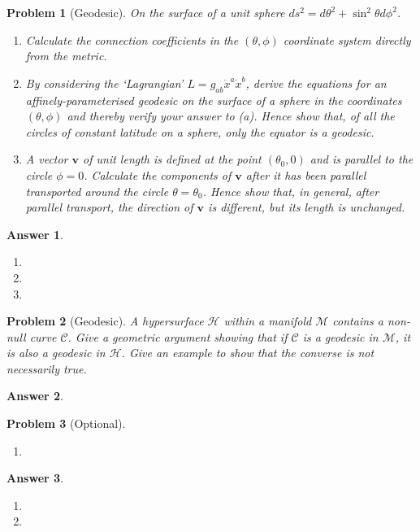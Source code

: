 \documentclass[a4paper]{article}
\newtheorem{ans}{Answer}[subsection]
\theoremstyle{new}
\newtheorem{qns}{Problem}[section]
\begin{document}
\begin{qns}[Geodesic]
On the surface of a unit sphere $ds^2 = d\theta^2 + \sin^2\theta d\phi^2$.
\begin{enumerate}[label=(\alph*)]
\item  Calculate the connection coefficients in the $(\theta,\phi)$ coordinate system directly from the metric.
\item By considering the ‘Lagrangian’ $L=g_{ab}\dot{x}^a\dot{x}^b$, derive the equations for an affinely-parameterised geodesic on the surface of a sphere in the coordinates $(\theta, \phi)$ and thereby verify your answer to (a). Hence show that, of all the circles of constant latitude on a sphere, only the equator is a geodesic.
\item A vector $\mathbf{v}$ of unit length is defined at the point $(\theta_0,0)$ and is parallel to the circle $\phi = 0$. Calculate the components of $\mathbf{v}$ after it has been parallel transported around the circle $\theta=\theta_0$. Hence show that, in general, after parallel transport, the direction of $\mathbf{v}$ is different, but its length is unchanged.
\end{enumerate}
\end{qns}
\begin{ans}\leavevmode
\begin{enumerate}[label=(\alph*)]
\item

\item 

\item 
\end{enumerate}
\end{ans}
\begin{qns}[Geodesic]
A hypersurface $\mathcal{H}$ within a manifold $\mathcal{M}$ contains a non-null curve $\mathcal{C}$. Give a geometric argument showing that if $\mathcal{C}$ is a geodesic in $\mathcal{M}$, it is also a geodesic in $\mathcal{H}$. Give an example to show that the converse is not necessarily true.
\end{qns}
\begin{ans}

\end{ans}
\newpage
\begin{qns}[Optional]\leavevmode
\begin{enumerate}[label=(\alph*)]
\item 

\end{enumerate}
\end{qns}
\begin{ans}\leavevmode
\begin{enumerate}[label=(\alph*)]
\item

\item 
\end{enumerate}
\end{ans}
\end{document}
